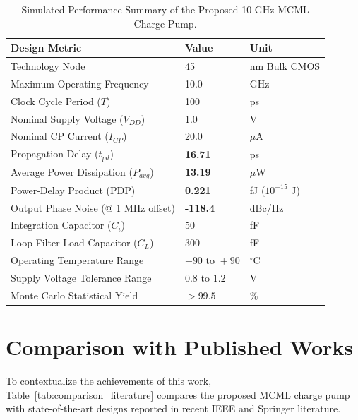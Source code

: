 \documentclass[11pt,a4paper]{report}
\begin{document}
\begin{table}[H]
    \centering
    \caption{Simulated Performance Summary of the Proposed 10 GHz MCML Charge Pump.}
    \label{tab:performance_summary}
    \begin{tabularx}{0.85\textwidth}{Xll}
        \toprule
        \textbf{Design Metric} & \textbf{Value} & \textbf{Unit} \\
        \midrule
        Technology Node & 45 & nm Bulk CMOS \\
        Maximum Operating Frequency & 10.0 & GHz \\
        Clock Cycle Period ($T$) & 100 & ps \\
        Nominal Supply Voltage ($V_{DD}$) & 1.0 & V \\
        Nominal CP Current ($I_{CP}$) & 20.0 & $\mu$A \\
        Propagation Delay ($t_{pd}$) & \textbf{16.71} & ps \\
        Average Power Dissipation ($P_{avg}$) & \textbf{13.19} & $\mu$W \\
        Power-Delay Product (PDP) & \textbf{0.221} & fJ ($10^{-15}\text{ J}$) \\
        Output Phase Noise (@ 1 MHz offset) & \textbf{-118.4} & dBc/Hz \\
        Integration Capacitor ($C_i$) & 50 & fF \\
        Loop Filter Load Capacitor ($C_L$) & 300 & fF \\
        Operating Temperature Range & $-90 \text{ to } +90$ & $^\circ$C \\
        Supply Voltage Tolerance Range & $0.8 \text{ to } 1.2$ & V \\
        Monte Carlo Statistical Yield & $>99.5$ & \% \\
        \bottomrule
    \end{tabularx}
\end{table}

\section{Comparison with Published Works}
To contextualize the achievements of this work, Table~\ref{tab:comparison_literature} compares the proposed MCML charge pump with state-of-the-art designs reported in recent IEEE and Springer literature.
\end{document}

